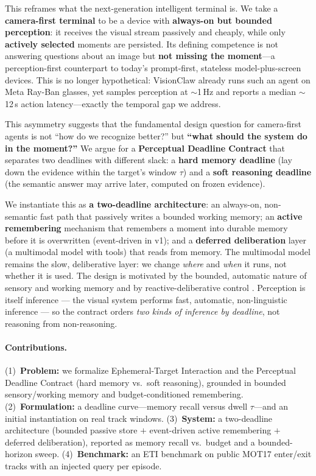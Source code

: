 \documentclass[11pt,a4paper]{article}
\begin{document}
This reframes what the next-generation intelligent terminal is. We take a \textbf{camera-first terminal} to be a device with \textbf{always-on but bounded perception}: it receives the visual stream passively and cheaply, while only \textbf{actively selected} moments are persisted. Its defining competence is not answering questions about an image but \textbf{not missing the moment}---a perception-first counterpart to today's prompt-first, stateless model-plus-screen devices. This is no longer hypothetical: VisionClaw \citep{liu2026visionclaw} already runs such an agent on Meta Ray-Ban glasses, yet samples perception at $\sim$1\,Hz and reports a median $\sim$12\,s action latency---exactly the temporal gap we address.

This asymmetry suggests that the fundamental design question for camera-first agents is not ``how do we recognize better?'' but \textbf{``what should the system do in the moment?''} We argue for a \textbf{Perceptual Deadline Contract} that separates two deadlines with different slack: a \textbf{hard memory deadline} (lay down the evidence within the target's window $\tau$) and a \textbf{soft reasoning deadline} (the semantic answer may arrive later, computed on frozen evidence).

We instantiate this as \textbf{a two-deadline architecture}: an always-on, non-semantic fast path that passively writes a bounded working memory; an \textbf{active remembering} mechanism that remembers a moment into durable memory before it is overwritten (event-driven in v1); and a \textbf{deferred deliberation} layer (a multimodal model with tools) that reads from memory. The multimodal model remains the slow, deliberative layer: we change \emph{where} and \emph{when} it runs, not whether it is used. The design is motivated by the bounded, automatic nature of sensory and working memory \citep{sperling1960brief,atkinson1968human,baddeley1974working,cowan2001magical} and by reactive-deliberative control \citep{brooks1986robust}. Perception is itself inference --- the visual system performs fast, automatic, non-linguistic inference \citep{rao1999predictive,kersten2004object} --- so the contract orders \emph{two kinds of inference by deadline}, not reasoning from non-reasoning.

\paragraph{Contributions.} (1)~\textbf{Problem:} we formalize Ephemeral-Target Interaction and the Perceptual Deadline Contract (hard memory vs.\ soft reasoning), grounded in bounded sensory/working memory and budget-conditioned remembering. (2)~\textbf{Formulation:} a deadline curve---memory recall versus dwell $\tau$---and an initial instantiation on real track windows. (3)~\textbf{System:} a two-deadline architecture (bounded passive store $+$ event-driven active remembering $+$ deferred deliberation), reported as memory recall vs.\ budget and a bounded-horizon sweep. (4)~\textbf{Benchmark:} an ETI benchmark on public MOT17 enter/exit tracks with an injected query per episode.
\end{document}
